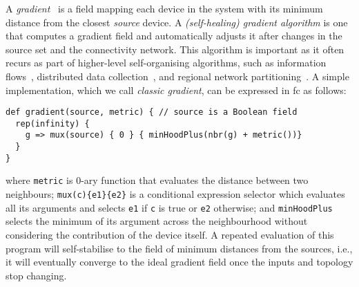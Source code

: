 A \emph{gradient}~\cite{DBLP:conf/ipsn/NagpalSB03,DBLP:journals/pervasive/MameiZL04,DBLP:conf/saso/AudritoCDV17} is a field mapping each device in the system with its minimum distance from the closest \emph{source} device.
%
A \emph{(self-healing) gradient algorithm}
 is one that computes a gradient field 
 and automatically adjusts it after changes in the source set and the connectivity network.
%
This algorithm is important 
 as it often recurs as part of higher-level self-organising algorithms, such as information flows~\cite{DBLP:conf/saso/WolfH07}, distributed data collection~\cite{DBLP:journals/cee/AudritoCDPV21}, and regional network partitioning~\cite{DBLP:conf/coordination/CasadeiPVN19}.
%
A simple implementation, which we call \emph{classic gradient}, can be expressed in \ac{fc} as follows:
\begin{lstlisting}
def gradient(source, metric) { // source is a Boolean field
  rep(infinity) {
    g => mux(source) { 0 } { minHoodPlus(nbr(g) + metric())}
  }
}
\end{lstlisting}
where \lstinline|metric| is 0-ary function that evaluates the distance between two neighbours; 
%
\lstinline|mux(c){e1}{e2}| is a conditional expression selector which evaluates all its arguments and selects \lstinline|e1| if \lstinline|c| is true or \lstinline|e2| otherwise; 
%
and \lstinline|minHoodPlus| selects the minimum of its argument across the neighbourhood without considering the contribution of the device itself. 
%
%
A repeated evaluation of this program will self-stabilise to the field of minimum distances from the sources, i.e., it will eventually converge to the ideal gradient field once the inputs and topology stop changing.

%
%
%

